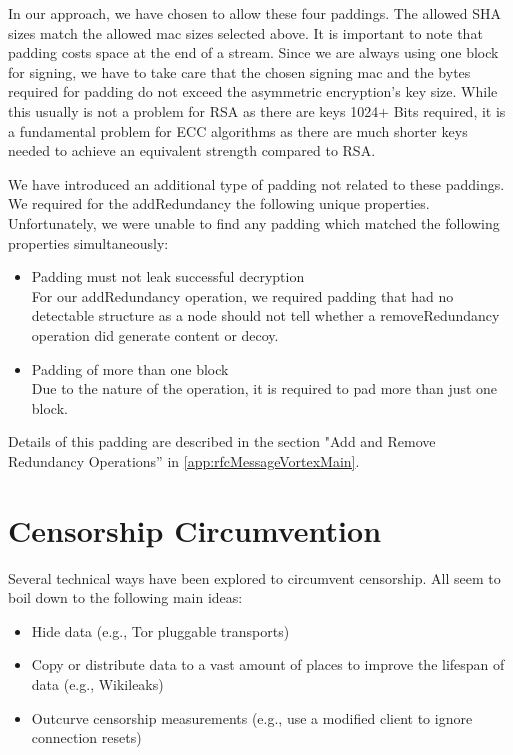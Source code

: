 In our approach, we have chosen to allow these four paddings. The allowed SHA sizes match the allowed mac sizes selected above. It is important to note that padding costs space at the end of a stream. Since we are always using one block for signing, we have to take care that the chosen signing mac and the bytes required for padding do not exceed the asymmetric encryption's key size. While this usually is not a problem for RSA as there are keys 1024+ Bits required, it is a fundamental problem for ECC algorithms as there are much shorter keys needed to achieve an equivalent strength compared to RSA. 

We have introduced an additional type of padding not related to these paddings. We required for the addRedundancy the following unique properties. Unfortunately, we were unable to find any padding which matched the following properties simultaneously:

\begin{itemize}
	\item Padding must not leak successful decryption\\
	For our addRedundancy operation, we required padding that had no detectable structure as a node should not tell whether a removeRedundancy operation did generate content or decoy. 
	\item Padding of more than one block\\
	Due to the nature of the operation, it is required to pad more than just one block.
\end{itemize}

Details of this padding are described in the section "Add and Remove Redundancy Operations'' in \cref{app:rfcMessageVortexMain}. 

\chapter{Censorship Circumvention}\label{sec:censorshipResearch}
Several technical ways have been explored to circumvent censorship. All seem to boil down to the following main ideas:
\begin{itemize}
	\item Hide data (e.g., Tor pluggable transports)
	\item Copy or distribute data to a vast amount of places to improve the lifespan of data (e.g., Wikileaks)
	\item Outcurve censorship measurements (e.g., use a modified client to ignore connection resets)
\end{itemize}

